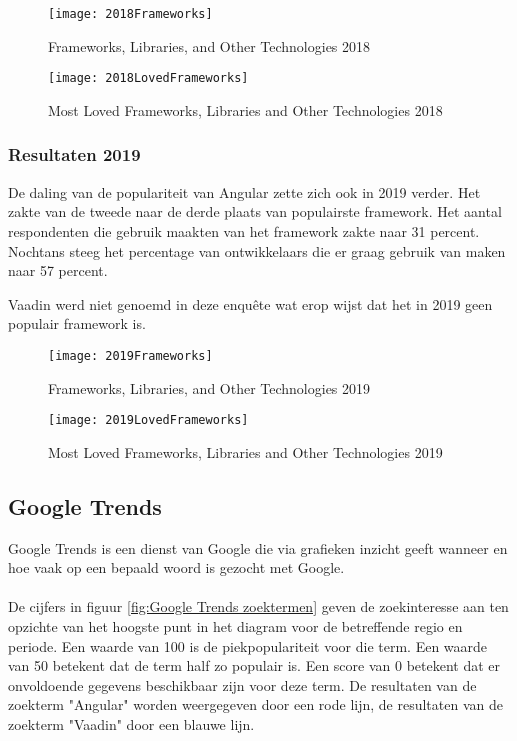 \begin{figure}[H]
	\centering
	\texttt{[image: 2018Frameworks]}
	\caption{Frameworks, Libraries, and Other Technologies 2018 \autocite{DeveloperSurvey2018}}
	\label{fig:Frameworks, Libraries, and Other Technologies 2018}
\end{figure}

\begin{figure}[H]
	\centering
	\texttt{[image: 2018LovedFrameworks]}
	\caption{Most Loved Frameworks, Libraries and Other Technologies 2018 \autocite{DeveloperSurvey2018}}
	\label{fig:Most Loved Frameworks, Libraries and Other Technologies 2018}
\end{figure}

\subsubsection{Resultaten 2019}
De daling van de populariteit van Angular zette zich ook in 2019 verder. Het zakte van de tweede naar de derde plaats van populairste framework. Het aantal respondenten die gebruik maakten van het framework zakte naar 31 percent. Nochtans steeg het percentage van ontwikkelaars die er graag gebruik van maken naar 57 percent.

Vaadin werd niet genoemd in deze enquête wat erop wijst dat het in 2019 geen populair framework is.

\begin{figure}[H]
	\centering
	\texttt{[image: 2019Frameworks]}
	\caption{Frameworks, Libraries, and Other Technologies 2019 \autocite{DeveloperSurvey2019}}
	\label{fig:Frameworks, Libraries, and Other Technologies 2019}
\end{figure}

\begin{figure}[H]
	\centering
	\texttt{[image: 2019LovedFrameworks]}
	\caption{Most Loved Frameworks, Libraries and Other Technologies 2019 \autocite{DeveloperSurvey2019}}
	\label{fig:Most Loved Frameworks, Libraries and Other Technologies 2019}
\end{figure}

\subsection{Google Trends}

Google Trends is een dienst van Google die via grafieken inzicht geeft wanneer en hoe vaak op een bepaald woord is gezocht met Google. \\ \\
De cijfers in figuur \ref{fig:Google Trends zoektermen} geven de zoekinteresse aan ten opzichte van het hoogste punt in het diagram voor de betreffende regio en periode. Een waarde van 100 is de piekpopulariteit voor die term. Een waarde van 50 betekent dat de term half zo populair is. Een score van 0 betekent dat er onvoldoende gegevens beschikbaar zijn voor deze term. De resultaten van de zoekterm "Angular" worden weergegeven door een rode lijn, de resultaten van de zoekterm "Vaadin" door een blauwe lijn.

